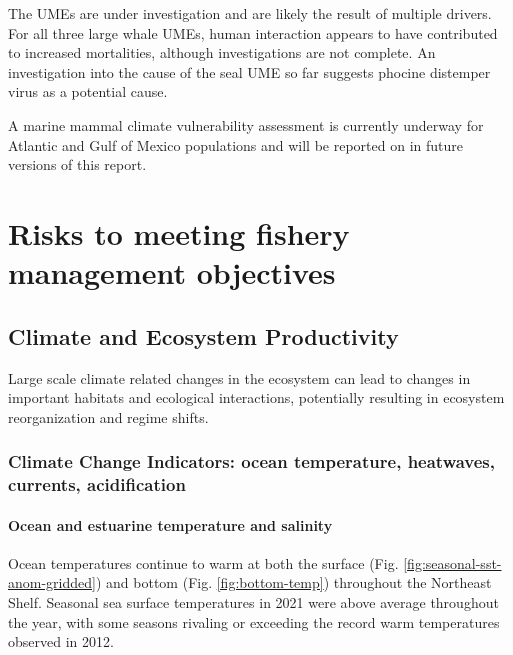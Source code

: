\documentclass[
  10pt,
]{article}
\begin{document}
The UMEs are under investigation and are likely the result of multiple
drivers. For all three large whale UMEs, human interaction appears to
have contributed to increased mortalities, although investigations are
not complete. An investigation into the cause of the seal UME so far
suggests phocine distemper virus as a potential cause.

A marine mammal climate vulnerability assessment is currently underway
for Atlantic and Gulf of Mexico populations and will be reported on in
future versions of this report.

\hypertarget{risks-to-meeting-fishery-management-objectives}{%
\section{Risks to meeting fishery management
objectives}\label{risks-to-meeting-fishery-management-objectives}}

\hypertarget{climate-and-ecosystem-productivity}{%
\subsection{Climate and Ecosystem
Productivity}\label{climate-and-ecosystem-productivity}}

Large scale climate related changes in the ecosystem can lead to changes
in important habitats and ecological interactions, potentially resulting
in ecosystem reorganization and regime shifts.

\hypertarget{climate-change-indicators-ocean-temperature-heatwaves-currents-acidification}{%
\subsubsection{Climate Change Indicators: ocean temperature, heatwaves,
currents,
acidification}\label{climate-change-indicators-ocean-temperature-heatwaves-currents-acidification}}

\hypertarget{ocean-and-estuarine-temperature-and-salinity}{%
\paragraph{Ocean and estuarine temperature and
salinity}\label{ocean-and-estuarine-temperature-and-salinity}}

Ocean temperatures continue to warm at both the surface (Fig.
\ref{fig:seasonal-sst-anom-gridded}) and bottom (Fig.
\ref{fig:bottom-temp}) throughout the Northeast Shelf. Seasonal sea
surface temperatures in 2021 were above average throughout the year,
with some seasons rivaling or exceeding the record warm temperatures
observed in 2012.
\end{document}
